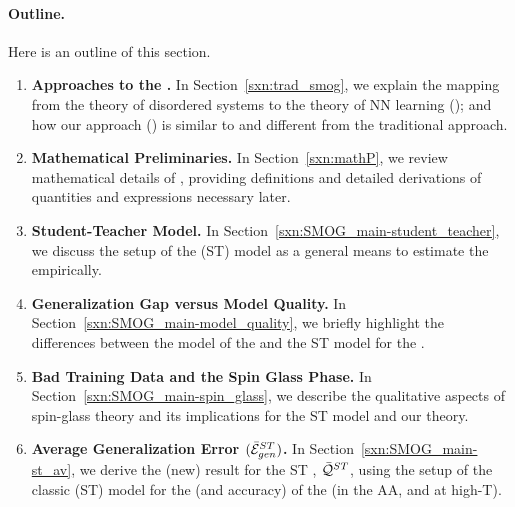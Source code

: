 \paragraph{Outline.}
Here is an outline of this section.
\begin{enumerate}[label=4.\arabic*]
\item
  \textbf{Approaches to the \SMOG.}
  In Section~\ref{sxn:trad_smog}, we explain the mapping from the \STATMECH theory of disordered systems
    to the \STATMECH theory of NN learning (\SMOG); and how our \SemiEmpirical approach (\SETOL)
    is similar to and different from the traditional approach.

  \item
      \textbf{Mathematical Preliminaries.}
    In Section~\ref{sxn:mathP}, we review mathematical details of \STATMECH, providing definitions
      and detailed derivations of quantities and expressions necessary later.  

    \item
        \textbf{Student-Teacher Model.}
      In Section~\ref{sxn:SMOG_main-student_teacher}, we discuss the setup of the \StudentTeacher (ST) model
    as a general means to estimate the \AverageGeneralizationError empirically. 

  \item
      \textbf{Generalization Gap versus Model Quality.}
    In Section~\ref{sxn:SMOG_main-model_quality}, we briefly highlight the differences between the \STATMECH model
    of the \GeneralizationAccuracy and the ST model for the \GeneralizationGap.

  \item
      \textbf{Bad Training Data and the Spin Glass Phase.}
    In Section~\ref{sxn:SMOG_main-spin_glass}, we describe the qualitative aspects of spin-glass theory
    and its implications for the ST model and our \SETOL theory.

  \item
      \textbf{Average Generalization Error $(\bar{\mathcal{E}}^{ST}_{gen})$.}
    In Section~\ref{sxn:SMOG_main-st_av}, we derive the (new) result for the
    ST \ModelQuality, $\bar{\mathcal{Q}}^{ST}$, using the setup of the classic (ST) model for the
    \GeneralizationError (and accuracy) of the \Perceptron (in the AA, and at high-T).
\end{enumerate}

